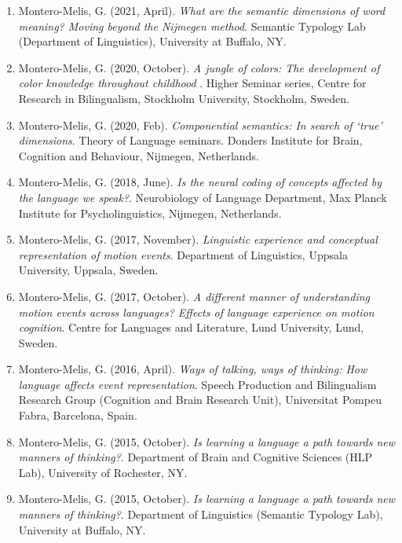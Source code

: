 \documentclass[margin, 11pt]{res} %
\begin{document}
\begin{resume}
\begin{enumerate}

\item Montero-Melis, G. (2021, April). \textit{What are the semantic dimensions of word meaning? Moving beyond the Nijmegen method}. Semantic Typology Lab (Department of Linguistics), University at Buffalo, NY.

\item Montero-Melis, G. (2020, October). \textit{A jungle of colors: The development of color knowledge throughout childhood
}. Higher Seminar series, Centre for Research in Bilingualism, Stockholm University, Stockholm, Sweden.

\item Montero-Melis, G. (2020, Feb). \textit{Componential semantics: 
In search of `true' dimensions}. Theory of Language seminars. Donders Institute for Brain, Cognition and Behaviour, Nijmegen, Netherlands.

\item Montero-Melis, G. (2018, June). \textit{Is the neural coding of concepts affected by the language we speak?}. Neurobiology of Language Department, Max Planck Institute for Psycholinguistics, Nijmegen, Netherlands.

\item Montero-Melis, G. (2017, November). \textit{Linguistic experience and conceptual representation of motion events}. Department of Linguistics, Uppsala University, Uppsala, Sweden.

\item Montero-Melis, G. (2017, October). \textit{A different manner of understanding motion events across languages? Effects of language experience on motion cognition}. Centre for Languages and Literature, Lund University, Lund, Sweden.

\item Montero-Melis, G. (2016, April). \textit{Ways of talking, ways of thinking: How language affects event representation}. Speech Production and Bilingualism Research Group (Cognition and Brain Research Unit), Universitat Pompeu Fabra, Barcelona, Spain.

\item Montero-Melis, G. (2015, October). \textit{Is learning a language a path towards new manners of thinking?}. Department of Brain and Cognitive Sciences (HLP Lab), University of Rochester, NY.

\item Montero-Melis, G. (2015, October). \textit{Is learning a language a path towards new manners of thinking?}. Department of Linguistics (Semantic Typology Lab), University at Buffalo, NY.


\end{enumerate}
\end{resume}
\end{document}
